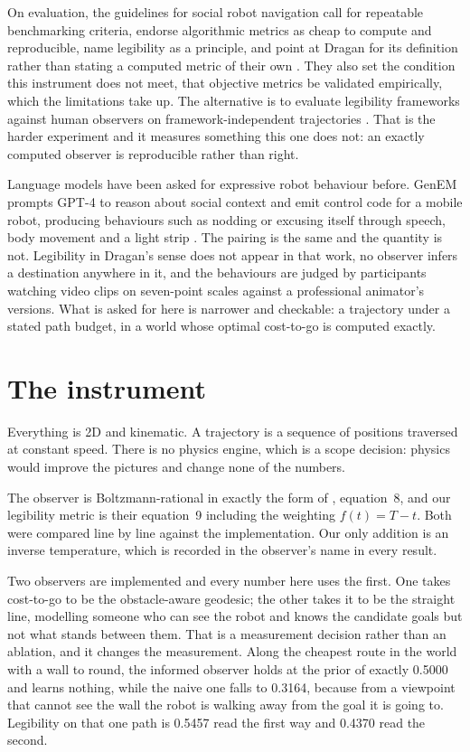 \documentclass[sigconf,nonacm]{acmart}
\begin{document}
On evaluation, the guidelines for social robot navigation call for
repeatable benchmarking criteria, endorse algorithmic metrics as cheap to
compute and reproducible, name legibility as a principle, and point at
Dragan for its definition rather than stating a computed metric of their
own \cite{francis2025principles}. They also set the condition this
instrument does not meet, that objective metrics be validated empirically,
which the limitations take up. The alternative is to evaluate legibility
frameworks against human observers on framework-independent trajectories
\cite{wallkotter2022evaluating}. That is the harder experiment and it
measures something this one does not: an exactly computed observer is
reproducible rather than right.

Language models have been asked for expressive robot behaviour before.
GenEM prompts GPT-4 to reason about social context and emit control code
for a mobile robot, producing behaviours such as nodding or excusing
itself through speech, body movement and a light strip
\cite{mahadevan2024generative}. The pairing is the same and the quantity
is not. Legibility in Dragan's sense does not appear in that work, no
observer infers a destination anywhere in it, and the behaviours are
judged by participants watching video clips on seven-point scales against
a professional animator's versions. What is asked for here is narrower and
checkable: a trajectory under a stated path budget, in a world whose
optimal cost-to-go is computed exactly.

\section{The instrument}

Everything is 2D and kinematic. A trajectory is a sequence of positions
traversed at constant speed. There is no physics engine, which is a
scope decision: physics would improve the pictures and change none of
the numbers.

The observer is Boltzmann-rational in exactly the form of
\cite{dragan2013legibility}, equation~8, and our legibility metric is
their equation~9 including the weighting $f(t) = T - t$. Both were
compared line by line against the implementation. Our only addition is an
inverse temperature, which is recorded in the observer's name in every
result.

Two observers are implemented and every number here uses the first. One
takes cost-to-go to be the obstacle-aware geodesic; the other takes it to
be the straight line, modelling someone who can see the robot and knows
the candidate goals but not what stands between them. That is a
measurement decision rather than an ablation, and it changes the
measurement. Along the cheapest route in the world with a wall to round,
the informed observer holds at the prior of exactly 0.5000 and learns
nothing, while the naive one falls to 0.3164, because from a viewpoint
that cannot see the wall the robot is walking away from the goal it is
going to. Legibility on that one path is 0.5457 read the first way and
0.4370 read the second.
\end{document}
